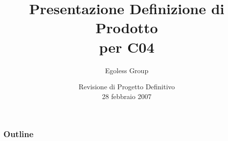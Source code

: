 



\title{Presentazione Definizione di Prodotto \\ per C04}

\author{Egoless Group}

\date[RPD 28/02/2007] %
{Revisione di Progetto Definitivo \\ 28 febbraio 2007}

\subject{Presentazione della definizione di prodotto per il capitolato C04}








\begin{frame}
  \titlepage
\end{frame}

\begin{frame}
  \frametitle{Outline}
  \tableofcontents
\end{frame}





